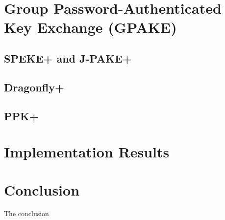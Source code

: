 \documentclass{amsart}
\theoremstyle{remark}
\begin{document}
\section{Group Password-Authenticated Key Exchange (GPAKE)} 
\label{sec:GPAKE}


\subsection{SPEKE+ and J-PAKE+}


\subsection{Dragonfly+}


\subsection{PPK+}


\section{Implementation Results}
\label{sec:Implementation}



\section{Conclusion}
\label{sec:Conclusion}
The conclusion



\nocite{*}



\end{document}
